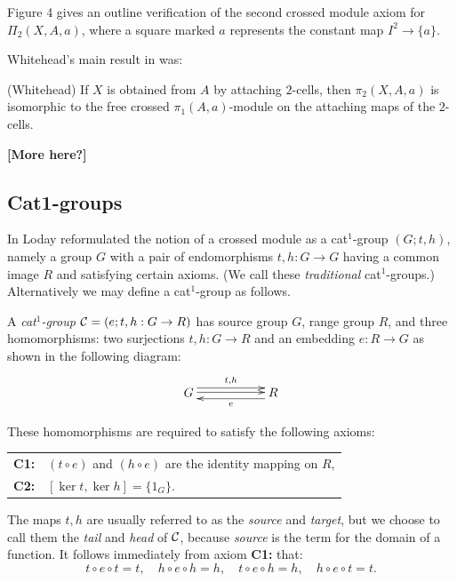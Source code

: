 Figure 4 gives an outline verification of the second crossed module axiom
for $\Pi_2(X,A,a)$, where a square marked $a$ represents the constant 
map  $I^2 \to \{a\}$.

Whitehead's main result in \cite{W-41,W-46,W-49a} was:
\begin{thm} {\rm (Whitehead)} \label{thm:W} 
If  $X$  is obtained from  $A$  by attaching $2$-cells, 
then  $\pi_2(X,A,a)$  is isomorphic to the free crossed
$\pi_1(A,a)$-module on the attaching maps of the $2$-cells.
\end{thm}

\noindent
{\bf [More here?]}





\subsection{Cat1-groups} \label{subs:cat1}  

In \cite{loday1} Loday reformulated the notion of a 
crossed module as a cat$^1$-group $(G;t,h)$, 
namely a group $G$ with a pair of endomorphisms $t,h : G \to G$
having a common image $R$ and satisfying certain axioms. 
(We call these \emph{traditional} cat$^1$-groups.) 
Alternatively we may define a cat$^1$-group as follows. 

\begin{defn} \label{defn:cat1-group}
A \emph{cat$^1$-group} $\mathcal{C} = (e;t,h : G \to R )$  
has source group $G$, range group $R$, and three homomorphisms:  
two surjections  $t,h : G \to R$ and an embedding  $e : R \to G$ 
as shown in the following diagram:
$$
\xymatrix{
 G  \ar[rr] <1.0ex>^{t,h} \ar[rr] <0.2ex>
   &&  R \ar[ll] <1.0ex>^e \\
}
$$

\noindent
These homomorphisms are required to satisfy the following axioms:
\begin{center}
\begin{tabular}{r l}
\textbf{C1:}  &  $(t \circ e)$ and $(h \circ e)$ 
are the identity mapping on $R$, \\
\textbf{C2:}  &  $[\ker t, \ker h] = \{ 1_G \}$.
\end{tabular}
\end{center}
\end{defn} 

The maps  $t,h$  are usually referred to as the 
  
\emph{source} and \emph{target}, but we choose to call them the 
\emph{tail} and \emph{head} of  $\mathcal{C}$, 
because \emph{source} is the {\GAP} term for the domain of a function. 
It follows immediately from axiom {\bf C1:} that: 
$$
t \circ e \circ t = t,\quad h \circ e \circ h = h,\quad 
t \circ e \circ h = h,\quad h \circ e \circ t = t.
$$

